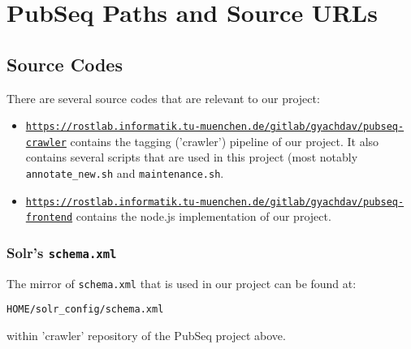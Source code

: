 
\chapter{PubSeq Paths and Source URLs} %

\label{AppendixA} %



\section{Source Codes}

There are several source codes that are relevant to our project:

\begin{itemize}
\item \href{https://rostlab.informatik.tu-muenchen.de/gitlab/gyachdav/pubseq-crawler}{\texttt{https://rostlab.informatik.tu-muenchen.de/gitlab/gyachdav/pubseq-crawler}} contains the tagging ('crawler') pipeline of our project. It also contains several scripts that are used in this project (most notably \texttt{annotate\_new.sh} and \texttt{maintenance.sh}.
\item \href{https://rostlab.informatik.tu-muenchen.de/gitlab/gyachdav/pubseq-frontend}{\texttt{https://rostlab.informatik.tu-muenchen.de/gitlab/gyachdav/pubseq-frontend}} contains the node.js implementation of our project.
\end{itemize}

\subsection{Solr's \texttt{schema.xml}}

\label{sec:SchemaXMLPath}

The mirror of \texttt{schema.xml} that is used in our project can be found at:

\begin{center}
\texttt{HOME/solr\_config/schema.xml}
\end{center}

within 'crawler' repository of the PubSeq project above.

